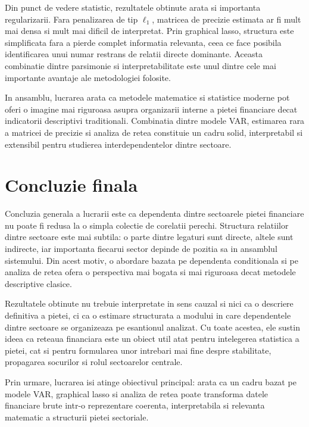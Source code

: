 Din punct de vedere statistic, rezultatele obtinute arata si importanta
regularizarii. Fara penalizarea de tip $\ell_1$, matricea de precizie estimata
ar fi mult mai densa si mult mai dificil de interpretat. Prin graphical lasso,
structura este simplificata fara a pierde complet informatia relevanta, ceea ce
face posibila identificarea unui numar restrans de relatii directe dominante.
Aceasta combinatie dintre parsimonie si interpretabilitate este unul dintre
cele mai importante avantaje ale metodologiei folosite.

In ansamblu, lucrarea arata ca metodele matematice si statistice moderne pot
oferi o imagine mai riguroasa asupra organizarii interne a pietei financiare
decat indicatorii descriptivi traditionali. Combinatia dintre modele VAR,
estimarea rara a matricei de precizie si analiza de retea constituie un cadru
solid, interpretabil si extensibil pentru studierea interdependentelor dintre
sectoare.

\section{Concluzie finala}

Concluzia generala a lucrarii este ca dependenta dintre sectoarele pietei
financiare nu poate fi redusa la o simpla colectie de corelatii perechi.
Structura relatiilor dintre sectoare este mai subtila: o parte dintre legaturi
sunt directe, altele sunt indirecte, iar importanta fiecarui sector depinde de
pozitia sa in ansamblul sistemului. Din acest motiv, o abordare bazata pe
dependenta conditionala si pe analiza de retea ofera o perspectiva mai bogata
si mai riguroasa decat metodele descriptive clasice.

Rezultatele obtinute nu trebuie interpretate in sens cauzal si nici ca o
descriere definitiva a pietei, ci ca o estimare structurata a modului in care
dependentele dintre sectoare se organizeaza pe esantionul analizat. Cu toate
acestea, ele sustin ideea ca reteaua financiara este un obiect util atat pentru
intelegerea statistica a pietei, cat si pentru formularea unor intrebari mai
fine despre stabilitate, propagarea socurilor si rolul sectoarelor centrale.

Prin urmare, lucrarea isi atinge obiectivul principal: arata ca un cadru bazat
pe modele VAR, graphical lasso si analiza de retea poate transforma datele
financiare brute intr-o reprezentare coerenta, interpretabila si relevanta
matematic a structurii pietei sectoriale.